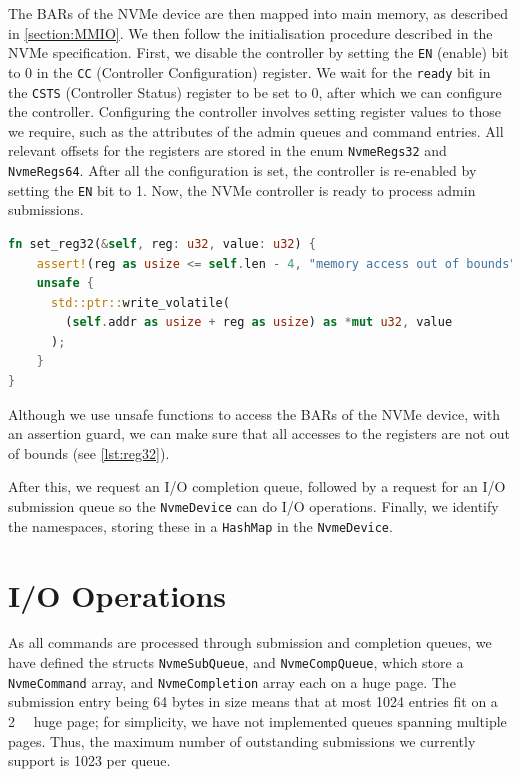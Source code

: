 The BARs of the NVMe device are then mapped into main memory, as described in \autoref{section:MMIO}. We then follow the initialisation procedure described in the NVMe specification. First, we disable the controller by setting the \texttt{EN} (enable) bit to 0 in the \texttt{CC} (Controller Configuration) register. We wait for the \texttt{ready} bit in the \texttt{CSTS} (Controller Status) register to be set to 0, after which we can configure the controller. Configuring the controller involves setting register values to those we require, such as the attributes of the admin queues and command entries. All relevant offsets for the registers are stored in the enum \texttt{NvmeRegs32} and \texttt{NvmeRegs64}. After all the configuration is set, the controller is re-enabled by setting the \texttt{EN} bit to 1. Now, the NVMe controller is ready to process admin submissions.

\begin{lstlisting}[language=Rust, label=lst:reg32,caption=Writing to a 32 bit register]
fn set_reg32(&self, reg: u32, value: u32) {
    assert!(reg as usize <= self.len - 4, "memory access out of bounds");
    unsafe {
      std::ptr::write_volatile(
        (self.addr as usize + reg as usize) as *mut u32, value
      );
    }
}
\end{lstlisting}

Although we use unsafe functions to access the BARs of the NVMe device, with an assertion guard, we can make sure that all accesses to the registers are not out of bounds (see \autoref{lst:reg32}).

After this, we request an I/O completion queue, followed by a request for an I/O submission queue so the \texttt{NvmeDevice} can do I/O operations. Finally, we identify the namespaces, storing these in a \texttt{HashMap} in the \texttt{NvmeDevice}.

\section{I/O Operations}\label{subsection:io}
As all commands are processed through submission and completion queues, we have defined the structs \texttt{NvmeSubQueue}, and \texttt{NvmeCompQueue}, which store a \texttt{NvmeCommand} array, and \texttt{NvmeCompletion} array each on a huge page. The submission entry being 64 bytes in size means that at most 1024 entries fit on a \qty{2}{\mebi\byte} huge page; for simplicity, we have not implemented queues spanning multiple pages. Thus, the maximum number of outstanding submissions we currently support is 1023 per queue.

